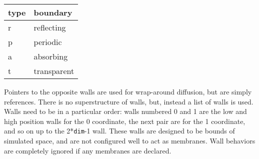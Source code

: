 \documentclass {scrbook}
\newcommand {\ttt} {\texttt}
\begin{document}
\begin{longtable}[c]{ll}
type & boundary\\
\hline
r & reflecting\\
p & periodic\\
a & absorbing\\
t & transparent\\
\end{longtable}

Pointers to the opposite walls are used for wrap-around diffusion, but are simply references. There is no superstructure of walls, but, instead a list of walls is used. Walls need to be in a particular order: walls numbered 0 and 1 are the low and high position walls for the 0 coordinate, the next pair are for the 1 coordinate, and so on up to the 2*\ttt{dim}-1 wall. These walls are designed to be bounds of simulated space, and are not configured well to act as membranes. Wall behaviors are completely ignored if any membranes are declared.
\end{document}
